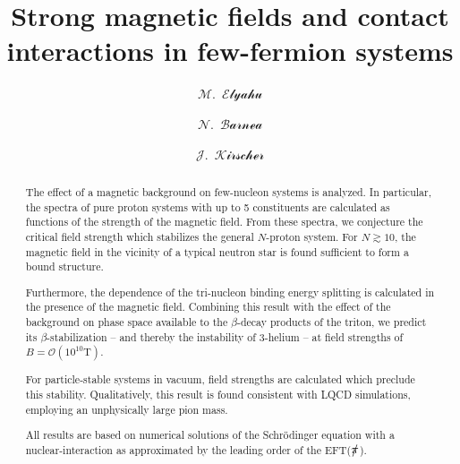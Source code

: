 \documentclass[aps,prd,onecolumn
,tightenlines,letterpaper,notitlepage,
nofootinbib]{revtex4-1}
\begin{document}
\newcommand{\rgm}{$\mathbb{R}$GM}
\newcommand{\ev}[1] {|\bra #1  \ket |^2}
\newcommand{\lam}[1]{$\Lambda=#1~$fm$^{-1}$}
\newcommand{\parg}[1] {\paragraph*{-\,\textit{#1}\,-}}
\newcommand{\nopi}{\pi\hspace{-6pt}/}
\newcommand{\ve}[1]{\ensuremath{\boldsymbol{#1}}}
\newcommand{\xvec}{\bs{x}}
\newcommand{\rvec}{\bs{r}}
\newcommand{\sgve}{\ensuremath{\boldsymbol{\sigma}}}
\newcommand{\tave}{\ensuremath{\boldsymbol{\tau}}}
\newcommand{\na}{\nabla}
\newcommand{\bra}{\langle}
\newcommand{\ket}{\rangle}
\newcommand{\tx}{\tilde{x}}
\newcommand{\eftnopi}{\mbox{EFT($\slashed{\pi}$)}}

\newcommand{\cmment}[2]{\paragraph*{Ecce: #1}\texttt{\textcolor{blue}{#2}}}



\author{$\mathcal{M}$.~$\mathcal{Elyahu}$}
\author{$\mathcal{N}$.~$\mathcal{Barnea}$}
\author{$\mathcal{J}$.~$\mathcal{Kirscher}$}

\title{
Strong magnetic fields and contact interactions in few-fermion systems
} 

\begin{abstract}
The effect of a magnetic background on few-nucleon systems is analyzed. In particular, the spectra of pure proton systems
with up to 5 constituents are calculated as functions of the strength of the magnetic field. From these spectra, we
conjecture the critical field strength which stabilizes the general $N$-proton system. For $N\gtrsim 10$, the magnetic field in
the vicinity of a typical neutron star is found sufficient to form a bound structure.

Furthermore, the dependence of the tri-nucleon binding energy splitting is calculated in the presence of the magnetic
field. Combining this result with the effect of the background on phase space available to the $\beta$-decay products
of the triton, we predict its $\beta$-stabilization -- and thereby the instability of 3-helium -- at field strengths of $B=\mathcal{O}(10^{10}\text{T})$.

For particle-stable systems in vacuum, field strengths are calculated which preclude this stability. Qualitatively, this result is found
consistent with LQCD simulations, employing an unphysically large pion mass.

All results are based on numerical solutions of the Schr\"odinger equation with a nuclear-interaction as approximated by the leading order
of the \eftnopi. 
\end{abstract}
\end{document}
